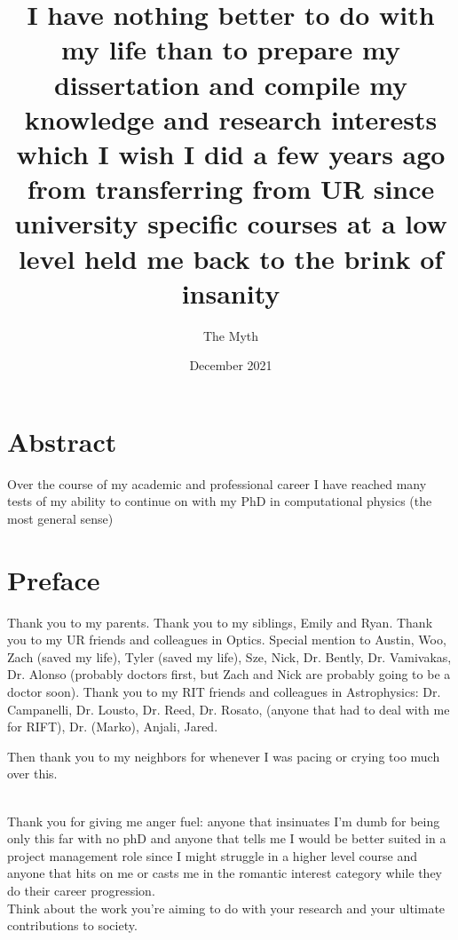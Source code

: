 \documentclass{dcthesis}
\title{I have nothing better to do with my life than to prepare my dissertation and compile my knowledge and research interests which I wish I did a few years ago from transferring from UR since university specific courses at a low level held me back to the brink of insanity}
\author{The Myth}
\date{December 2021}
\theoremstyle{definition}
\theoremstyle{remark}
\begin{document}
\frontmatter

\maketitle
\restoregeometry

\chapter*{Abstract}
Over the course of my academic and professional career I have reached many tests of my ability to continue on with my PhD in computational physics (the most general sense) 

\chapter*{Preface}
Thank you to my parents. Thank you to my siblings, Emily and Ryan. Thank you to my UR friends and colleagues in Optics. Special mention to Austin, Woo, Zach (saved my life), Tyler (saved my life), Sze, Nick, Dr. Bently, Dr. Vamivakas, Dr. Alonso (probably doctors first, but Zach and Nick are probably going to be a doctor soon). Thank you to my RIT friends and colleagues in Astrophysics: Dr. Campanelli, Dr. Lousto, Dr. Reed, Dr. Rosato, (anyone that had to deal with me for RIFT), Dr. (Marko), Anjali, Jared. 

Then thank you to my neighbors for whenever I was pacing or crying too much over this.  

\\ 
Thank you for giving me anger fuel: anyone that insinuates I'm dumb for being only this far with no phD and anyone that tells me I would be better suited in a project management role since I might struggle in a higher level course and anyone that hits on me or casts me in the romantic interest category while they do their career progression. \\ 

Think about the work you're aiming to do with your research and your ultimate contributions to society. \\
\end{document}
